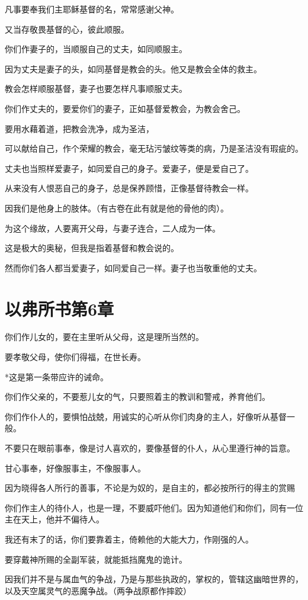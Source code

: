 \documentclass[12pt,oneside]{book}
\begin{document}
凡事要奉我们主耶稣基督的名，常常感谢父神。

又当存敬畏基督的心，彼此顺服。

你们作妻子的，当顺服自己的丈夫，如同顺服主。

因为丈夫是妻子的头，如同基督是教会的头。他又是教会全体的救主。

教会怎样顺服基督，妻子也要怎样凡事顺服丈夫。

你们作丈夫的，要爱你们的妻子，正如基督爱教会，为教会舍己。

要用水藉着道，把教会洗净，成为圣洁，

可以献给自己，作个荣耀的教会，毫无玷污皱纹等类的病，乃是圣洁没有瑕疵的。

丈夫也当照样爱妻子，如同爱自己的身子。爱妻子，便是爱自己了。

从来没有人恨恶自己的身子，总是保养顾惜，正像基督待教会一样。

因我们是他身上的肢体。（有古卷在此有就是他的骨他的肉）。

为这个缘故，人要离开父母，与妻子连合，二人成为一体。

这是极大的奥秘，但我是指着基督和教会说的。

然而你们各人都当爱妻子，如同爱自己一样。妻子也当敬重他的丈夫。

\chapter{以弗所书第6章}
你们作儿女的，要在主里听从父母，这是理所当然的。

要孝敬父母，使你们得福，在世长寿。

*这是第一条带应许的诫命。

你们作父亲的，不要惹儿女的气，只要照着主的教训和警戒，养育他们。

你们作仆人的，要惧怕战兢，用诚实的心听从你们肉身的主人，好像听从基督一般。

不要只在眼前事奉，像是讨人喜欢的，要像基督的仆人，从心里遵行神的旨意。

甘心事奉，好像服事主，不像服事人。

因为晓得各人所行的善事，不论是为奴的，是自主的，都必按所行的得主的赏赐

你们作主人的待仆人，也是一理，不要威吓他们。因为知道他们和你们，同有一位主在天上，他并不偏待人。

我还有末了的话，你们要靠着主，倚赖他的大能大力，作刚强的人。

要穿戴神所赐的全副军装，就能抵挡魔鬼的诡计。

因我们并不是与属血气的争战，乃是与那些执政的，掌权的，管辖这幽暗世界的，以及天空属灵气的恶魔争战。（两争战原都作摔跤）
\end{document}

